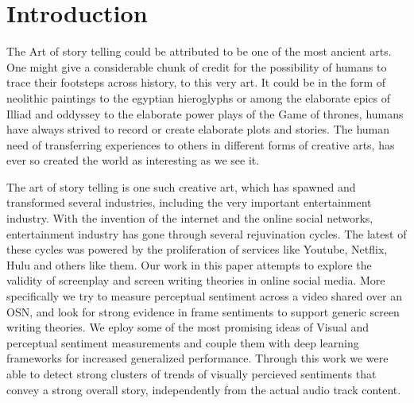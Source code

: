 \section{Introduction}
The Art of story telling could be attributed to be one of the most ancient arts. One might give a considerable chunk of credit for the possibility of humans to trace their footsteps across history, to this very art. It could be in the form of neolithic paintings to the egyptian hieroglyphs or among the elaborate epics of Illiad and oddyssey to the elaborate power plays of the Game of thrones, humans have always strived to record or create elaborate plots and stories. The human need of transferring experiences to others in different forms of creative arts, has ever so created the world as interesting as we see it. 
\par
The art of story telling is one such creative art, which has spawned and transformed several industries, including the very important entertainment industry. With the invention of the internet and the online social networks, entertainment industry has gone through several rejuvination cycles. The latest of these cycles was powered by the proliferation of services like Youtube, Netflix, Hulu and others like them. Our work in this paper attempts to explore the validity of screenplay and screen writing theories in online social media. More specifically we try to measure perceptual sentiment across a video shared over an OSN, and look for strong evidence in frame sentiments to support generic screen writing theories. We eploy some of the most promising ideas of Visual and perceptual sentiment measurements \cite{SentiBank} and couple them with deep learning frameworks for increased generalized performance. Through this work we were able to detect strong clusters of trends of visually percieved sentiments that convey a strong overall story, independently from the actual audio track content. 
